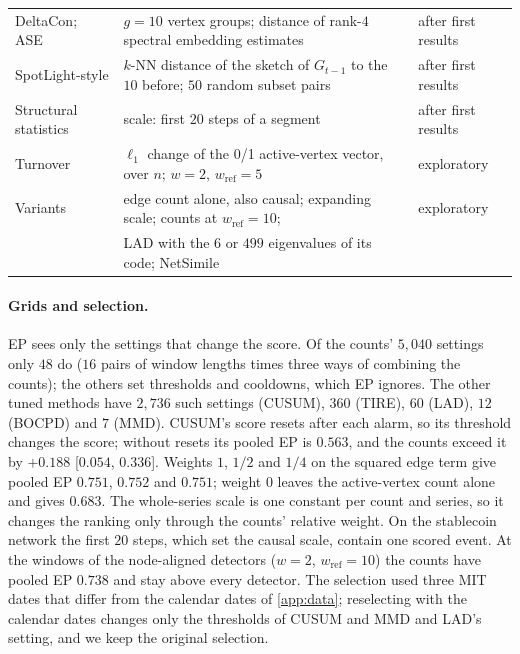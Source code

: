 \documentclass[11pt]{article}
\let\dsmidrule\midrule
\renewcommand{\midrule}{\arrayrulecolor{dsrule}\dsmidrule\arrayrulecolor{dsnavy}}
\theoremstyle{dsplain}
\theoremstyle{definition}
\begin{document}
\begin{table}[!htb]
\begin{tabular}{@{}lll@{}}
    DeltaCon; ASE & $g = 10$ vertex groups; distance of rank-$4$ spectral embedding estimates & after first results \\
    SpotLight-style & $k$-NN distance of the sketch of $G_{t-1}$ to the $10$ before; $50$ random subset pairs & after first results \\
    Structural statistics & scale: first $20$ steps of a segment & after first results \\
    \midrule
    Turnover & $\ell_1$ change of the 0/1 active-vertex vector, over $n$; $w = 2$, $w_{\mathrm{ref}} = 5$ & exploratory \\
    Variants & edge count alone, also causal; expanding scale; counts at $w_{\mathrm{ref}} = 10$; & exploratory \\
    & LAD with the $6$ or $499$ eigenvalues of its code; NetSimile & \\
    \bottomrule
  \end{tabular}
\end{table}

\paragraph{Grids and selection.} EP sees only the settings that change the score. Of the counts' $5{,}040$
settings only $48$ do ($16$ pairs of window lengths times three ways of combining the counts); the others
set thresholds and cooldowns, which EP ignores. The other tuned methods have $2{,}736$ such settings
(CUSUM), $360$ (TIRE), $60$ (LAD), $12$ (BOCPD) and $7$ (MMD). CUSUM's score resets after each alarm, so
its threshold changes the score; without resets its pooled EP is $0.563$, and the counts exceed it by
$+0.188$ [$0.054$, $0.336$]. Weights $1$, $1/2$ and $1/4$ on the squared edge term give pooled EP $0.751$,
$0.752$ and $0.751$; weight $0$ leaves the active-vertex count alone and gives $0.683$. The whole-series
scale is one constant per count and series, so it changes the ranking only through the counts' relative
weight. On the stablecoin network the first $20$ steps, which set the causal scale, contain one scored
event. At the windows of the node-aligned detectors ($w = 2$, $w_{\mathrm{ref}} = 10$) the counts have
pooled EP $0.738$ and stay above every detector. The selection used three MIT dates that differ from the
calendar dates of \cref{app:data}; reselecting with the calendar dates changes only the thresholds of CUSUM
and MMD and LAD's setting, and we keep the original selection.
\end{document}
